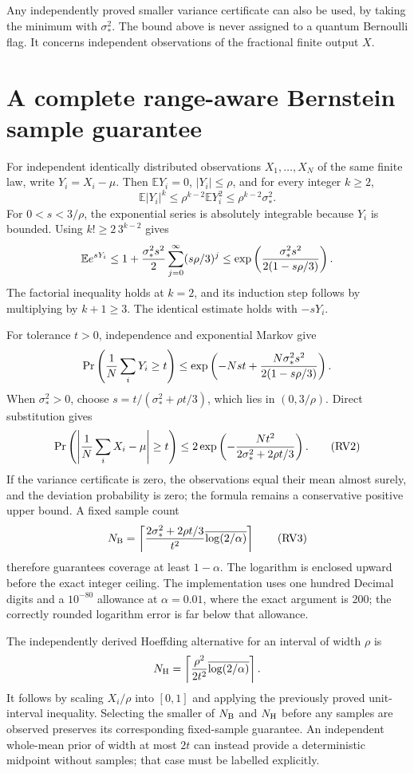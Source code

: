 Any independently proved smaller variance certificate can also be used, by taking the minimum with \(\sigma_*^2\). The bound above is never assigned to a quantum Bernoulli flag. It concerns independent observations of the fractional finite output \(X\).

\section{A complete range-aware Bernstein sample guarantee}
\label{sec:range-classical-bernstein}

For independent identically distributed observations \(X_1,\ldots,X_N\) of the same finite law, write \(Y_i=X_i-\mu\). Then \(\mathbb EY_i=0\), \(|Y_i|\leq\rho\), and for every integer \(k\geq2\),
\[
 \mathbb E|Y_i|^k\leq\rho^{k-2}\mathbb EY_i^2
 \leq\rho^{k-2}\sigma_*^2.
\]
For \(0<s<3/\rho\), the exponential series is absolutely integrable because \(Y_i\) is bounded. Using \(k!\geq2\,3^{k-2}\) gives
\[
 \mathbb E e^{sY_i}
 \leq1+{\sigma_*^2s^2\over2}
               \sum_{j=0}^{\infty}(s\rho/3)^j
 \leq\exp\left({\sigma_*^2s^2\over2(1-s\rho/3)}\right).
\]
The factorial inequality holds at \(k=2\), and its induction step follows by multiplying by \(k+1\geq3\). The identical estimate holds with \(-sY_i\).

For tolerance \(t>0\), independence and exponential Markov give
\[
 \Pr\left({1\over N}\sum_iY_i\geq t\right)
 \leq\exp\left(-Nst+
      {N\sigma_*^2s^2\over2(1-s\rho/3)}\right).
\]
When \(\sigma_*^2>0\), choose
\(s=t/(\sigma_*^2+\rho t/3)\), which lies in \((0,3/\rho)\). Direct substitution gives
\[
 \Pr\left(\left|{1\over N}\sum_iX_i-\mu\right|\geq t\right)
 \leq2\exp\left(-{Nt^2\over2\sigma_*^2+2\rho t/3}\right).
 \tag{RV2}\label{eq:range-bernstein-confidence}
\]
If the variance certificate is zero, the observations equal their mean almost surely, and the deviation probability is zero; the formula remains a conservative positive upper bound. A fixed sample count
\[
 N_{\rm B}=\left\lceil
 {2\sigma_*^2+2\rho t/3\over t^2}
 \overline{\log(2/\alpha)}\right\rceil
 \tag{RV3}\label{eq:range-bernstein-sample}
\]
therefore guarantees coverage at least \(1-\alpha\). The logarithm is enclosed upward before the exact integer ceiling. The implementation uses one hundred Decimal digits and a \(10^{-80}\) allowance at \(\alpha=0.01\), where the exact argument is 200; the correctly rounded logarithm error is far below that allowance.

The independently derived Hoeffding alternative for an interval of width \(\rho\) is
\[
 N_{\rm H}=\left\lceil{\rho^2\over2t^2}
       \overline{\log(2/\alpha)}\right\rceil.
\]
It follows by scaling \(X_i/\rho\) into \([0,1]\) and applying the previously proved unit-interval inequality. Selecting the smaller of \(N_{\rm B}\) and \(N_{\rm H}\) before any samples are observed preserves its corresponding fixed-sample guarantee. An independent whole-mean prior of width at most \(2t\) can instead provide a deterministic midpoint without samples; that case must be labelled explicitly.

